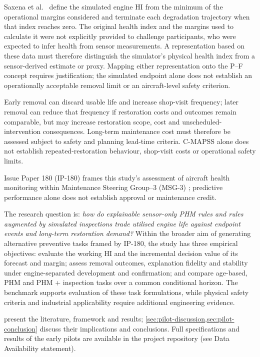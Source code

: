 \documentclass[preprint,12pt]{elsarticle}
\begin{document}
Saxena et al.\ \cite{Saxena2008} define the simulated engine HI from the minimum of the operational margins considered and terminate each degradation trajectory when that index reaches zero. The original health index and the margins used to calculate it were not explicitly provided to challenge participants, who were expected to infer health from sensor measurements. A representation based on these data must therefore distinguish the simulator's physical health index from a sensor-derived estimate or proxy. Mapping either representation onto the P--F concept requires justification; the simulated endpoint alone does not establish an operationally acceptable removal limit or an aircraft-level safety criterion.

Early removal can discard usable life and increase shop-visit frequency; later removal can reduce that frequency if restoration costs and outcomes remain comparable, but may increase restoration scope, cost and unscheduled-intervention consequences. Long-term maintenance cost must therefore be assessed subject to safety and planning lead-time criteria. C-MAPSS alone does not establish repeated-restoration behaviour, shop-visit costs or operational safety limits.

Issue Paper 180 (IP-180) frames this study's assessment of aircraft health monitoring within Maintenance Steering Group--3 (MSG-3) \cite{IP180}; predictive performance alone does not establish approval or maintenance credit.

The research question is: \emph{how do explainable sensor-only PHM rules and rules augmented by simulated inspections trade utilised engine life against endpoint events and long-term restoration demand?} Within the broader aim of generating alternative preventive tasks framed by IP-180, the study has three empirical objectives: evaluate the working HI and the incremental decision value of its forecast and margin; assess removal outcomes, explanation fidelity and stability under engine-separated development and confirmation; and compare age-based, PHM and PHM + inspection tasks over a common conditional horizon. The benchmark supports evaluation of these task formulations, while physical safety criteria and industrial applicability require additional engineering evidence.

 present the literature, framework and results; \cref{sec:pilot-discussion,sec:pilot-conclusion} discuss their implications and conclusions. Full specifications and results of the early pilots are available in the project repository (see Data Availability statement).
\end{document}
